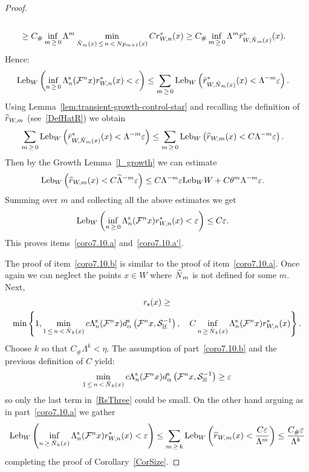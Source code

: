 \documentclass[AHL, Unicode, longabstracts,published]{cedram}
\newcommand{\eps}{\varepsilon}
\newcommand{\stable}{\text{s}}
\newcommand{\homo}{\mathbb{H}}
\newcommand{\cm}{\mathcal{F}}
\newcommand{\dadmPrivate}{d\adm}
\newcommand{\ds}{\dadmPrivate^{\stable}}
\newcommand{\rs}{r_{\stable}}
\newcommand{\singPrivate}{\mathcal{S}}
\newcommand{\hsing}[1]{{\singPrivate}_\homo^{#1}}
\newcommand{\adm}{_{\alpha^{+}}}
\newcommand{\Np}{\hat N}
\newcommand{\Leb}{\textup{Leb}}
\newcommand{\Const}{C_\#}
\renewcommand{\adm}{_{\alpha}}
\let\oldhat\hat
\renewcommand*{\hat}[1]{\mathchoice{\widehat{#1}}{\widehat{#1}}{\oldhat{#1}}{\oldhat{#1}}}
\begin{document}
\begin{proof}
\begin{multline*}
\begin{aligned}
\\
&\ge \Const\inf_{m\,\ge\,0}\Lambda^{m}
\min_{\Np_{m}(x)\,\le\,n\,< \,Np_{m+1}(x)}Cr_{W,n}^{*}(x)
\ge \Const\inf_{m\,\ge\,0}\Lambda^{m}
\bar r^{*}_{W,\Np_{m}(x)}(x).
\end{aligned}
\end{multline*}
Hence:
\begin{align*}
\Leb_{W}\left(\inf_{n\,\ge\,0}\Lambda_{n}^{\stable}(\cm^{n}x)r_{W,n}^{*}(x) <\eps\right) &\le \sum_{m\,\ge\,0}\Leb_{W}\left(\bar r^{*}_{W,\Np_{m}(x)}(x) < \Lambda^{-m}\eps\right).
\end{align*}
Using Lemma~\ref{lem:transient-growth-control-star} and recalling the definition of $\hat r_{W,m}$ (see~\eqref{DefHatR}) we obtain
\begin{align*}
\sum_{m\,\ge\,0}\Leb_{W}\left(\bar r^{*}_{W,\Np_{m}(x)}(x) < \Lambda^{-m}\eps\right)&\le
\sum_{m\,\ge\,0}\Leb_{W}\left(\hat r_{W,m}(x) < C\Lambda^{-m}\eps\right).
\end{align*}
Then by the Growth Lemma~\ref{l_growth} we can estimate
\begin{align*}
\Leb_{W}\left(\hat r_{W,m}(x) < C\hat\Lambda^{-m}\eps\right)&\le C\Lambda^{-m}\eps\Leb_{W}W + C\theta^{m}\Lambda^{-m}\eps.
\end{align*}
Summing over $m$ and collecting all the above estimates we get
\begin{align*}
\Leb_{W}\left(\inf_{n\,\ge\,0}\Lambda_{n}^{\stable}(\cm^{n}x)r_{W,n}^{*}(x) <\eps\right) &\le C\eps.
\end{align*}
This proves items~\eqref{coro7.10.a} and~\eqref{coro7.10.a'}.

The proof of item~\eqref{coro7.10.b} is similar to the proof of item~\eqref{coro7.10.a}. Once again we can neglect the points $x\in W$ where $\Np_{m}$ is not defined for some $m$. Next,
\begin{multline}\label{RsThree}
\rs(x) \ge\\
\min\left\{1,
\min_{1\,\le\,n\,<\,\Np_{k}(x)}c\Lambda_{n}^{\stable}(\cm^{n} x)\ds\left(\cm^{n} x,\hsing{-1}\right),\quad 
C \inf_{n\,\ge\,\Np_{k}(x)}\Lambda_{n}^{\stable}(\cm^{n}x)r_{W,n}^{*}(x)\right\}.
\end{multline}
Choose $k$ so that $\Const\Lambda^{k} < \eta$. The assumption of part~\eqref{coro7.10.b} and the previous definition of $C$ yield:
\begin{align*}
\min_{1\,\le\,n\,<\,\Np_{k}(x)}c\Lambda_{n}^{\stable}(\cm^{n} x)\ds\left(\cm^{n} x,\hsing{-1}\right) \ge \eps
\end{align*}
so only the last term in~\eqref{RsThree} could be small. On the other hand arguing as in part~\eqref{coro7.10.a} we gather
\[
\Leb_W\left(
\inf_{n\,\ge\,\Np_{k}(x)}\Lambda_{n}^{\stable}(\cm^{n}x)r_{W,n}^{*}(x)<\eps\right)
\le \sum_{m\,\ge\,k}\Leb_{W}\left(\hat r_{W,m}(x) < \frac{C\eps}{ \Lambda^{m}}\right)
\le \frac{\Const \eps}{ \Lambda^{k}}
\]
completing the proof of Corollary~\ref{CorSize}.
\end{proof}
\end{document}
